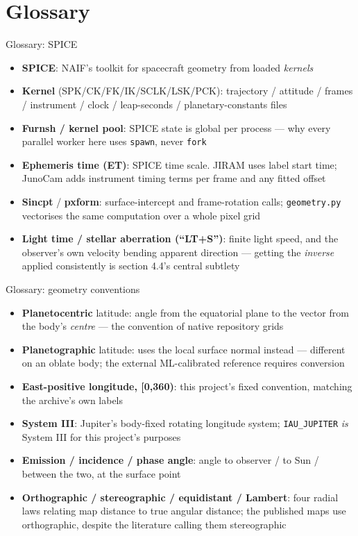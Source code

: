\documentclass[aspectratio=169,11pt]{beamer}
\newcommand{\currevsec}{}
\newcommand{\revsec}[1]{\gdef\currevsec{#1}}
\begin{document}
\section{Glossary}

\begin{frame}{Glossary: SPICE}
  \revsec{8}
  \scriptsize
  \begin{itemize}
    \item \textbf{SPICE}: NAIF's toolkit for spacecraft geometry from loaded \emph{kernels}
    \item \textbf{Kernel} (SPK/CK/FK/IK/SCLK/LSK/PCK): trajectory / attitude / frames / instrument / clock / leap-seconds / planetary-constants files
    \item \textbf{Furnsh / kernel pool}: SPICE state is global per process --- why every parallel worker here uses \texttt{spawn}, never \texttt{fork}
    \item \textbf{Ephemeris time (ET)}: SPICE time scale. JIRAM uses label start time; JunoCam adds instrument timing terms per frame and any fitted offset
    \item \textbf{Sincpt} / \textbf{pxform}: surface-intercept and frame-rotation calls; \texttt{geometry.py} vectorises the same computation over a whole pixel grid
    \item \textbf{Light time / stellar aberration (``LT+S'')}: finite light speed, and the observer's own velocity bending apparent direction --- getting the \emph{inverse} applied consistently is section 4.4's central subtlety
  \end{itemize}
\end{frame}

\begin{frame}{Glossary: geometry conventions}
  \revsec{8}
  \scriptsize
  \begin{itemize}
    \item \textbf{Planetocentric} latitude: angle from the equatorial plane to the vector from the body's \emph{centre} --- the convention of native repository grids
    \item \textbf{Planetographic} latitude: uses the local surface normal instead --- different on an oblate body; the external ML-calibrated reference requires conversion
    \item \textbf{East-positive longitude, [0,360)}: this project's fixed convention, matching the archive's own labels
    \item \textbf{System III}: Jupiter's body-fixed rotating longitude system; \texttt{IAU\_JUPITER} \emph{is} System III for this project's purposes
    \item \textbf{Emission / incidence / phase angle}: angle to observer / to Sun / between the two, at the surface point
    \item \textbf{Orthographic / stereographic / equidistant / Lambert}: four radial laws relating map distance to true angular distance; the published maps use orthographic, despite the literature calling them stereographic
  \end{itemize}
\end{frame}
\end{document}
